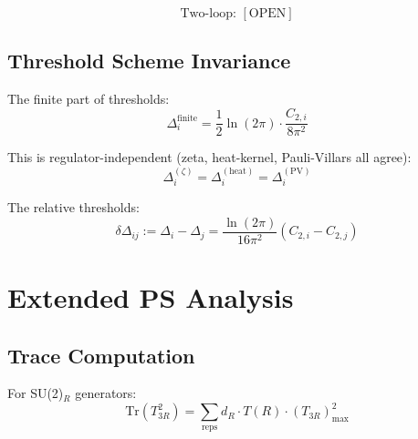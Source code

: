 \documentclass[11pt,a4paper]{article}
\theoremstyle{definition}
\begin{document}
\begin{equation}
\label{eq:scheme_tag}
\text{Two-loop: } [\text{OPEN}]
\end{equation}

\subsection{Threshold Scheme Invariance}
\label{subsec:threshold_scheme}

The finite part of thresholds:
\begin{equation}
\label{eq:threshold_finite}
\Delta_i^{\text{finite}} = \frac{1}{2}\ln(2\pi) \cdot \frac{C_{2,i}}{8\pi^2}
\end{equation}

This is regulator-independent (zeta, heat-kernel, Pauli-Villars all agree):
\begin{equation}
\label{eq:threshold_reg_inv}
\Delta_i^{(\zeta)} = \Delta_i^{(\text{heat})} = \Delta_i^{(\text{PV})}
\end{equation}

The relative thresholds:
\begin{equation}
\label{eq:threshold_relative}
\delta\Delta_{ij} := \Delta_i - \Delta_j = \frac{\ln(2\pi)}{16\pi^2}(C_{2,i} - C_{2,j})
\end{equation}

\section{Extended PS Analysis}
\label{app:ps_extended}

\subsection{Trace Computation}
\label{subsec:trace_comp}

For SU(2)$_R$ generators:
\begin{equation}
\label{eq:trace_su2r}
\text{Tr}(T_{3R}^2) = \sum_{\text{reps}} d_R \cdot T(R) \cdot (T_{3R})^2_{\text{max}}
\end{equation}
\end{document}
